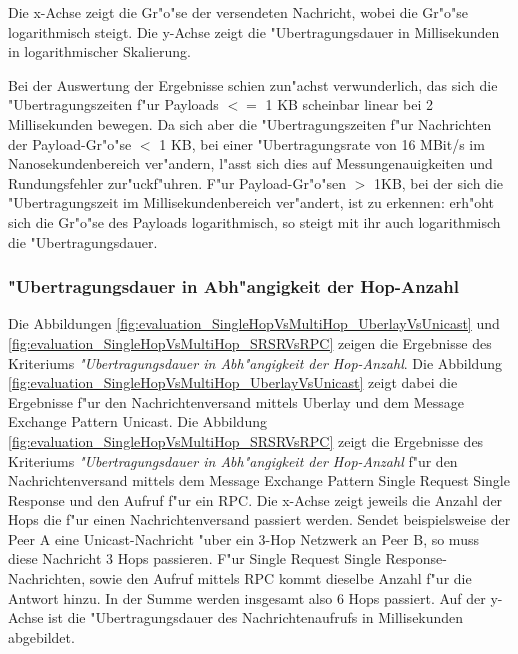 Die x-Achse zeigt die Gr"o"se der versendeten Nachricht, wobei die Gr"o"se logarithmisch steigt. Die y-Achse zeigt die "Ubertragungsdauer in Millisekunden in logarithmischer Skalierung.

Bei der Auswertung der Ergebnisse schien zun"achst verwunderlich, das sich die "Ubertragungszeiten f"ur Payloads $<=$ 1 KB scheinbar linear bei 2 Millisekunden bewegen. Da sich aber die "Ubertragungszeiten f"ur Nachrichten der Payload-Gr"o"se $<$ 1 KB, bei einer "Ubertragungsrate von 16 MBit/s im Nanosekundenbereich ver"andern, l"asst sich dies auf Messungenauigkeiten und Rundungsfehler zur"uckf"uhren. F"ur Payload-Gr"o"sen $>$ 1KB, bei der sich die "Ubertragungszeit  im Millisekundenbereich ver"andert, ist zu erkennen: erh"oht sich die Gr"o"se des Payloads logarithmisch, so steigt mit ihr auch logarithmisch die "Ubertragungsdauer.

\subsubsection{"Ubertragungsdauer in Abh"angigkeit der Hop-Anzahl}



Die Abbildungen \ref{fig:evaluation_SingleHopVsMultiHop_UberlayVsUnicast} und \ref{fig:evaluation_SingleHopVsMultiHop_SRSRVsRPC} zeigen die Ergebnisse des Kriteriums \emph{"Ubertragungsdauer in Abh"angigkeit der Hop-Anzahl}. Die Abbildung \ref{fig:evaluation_SingleHopVsMultiHop_UberlayVsUnicast} zeigt dabei die Ergebnisse f"ur den Nachrichtenversand mittels Uberlay und dem Message Exchange Pattern Unicast. Die Abbildung \ref{fig:evaluation_SingleHopVsMultiHop_SRSRVsRPC} zeigt die Ergebnisse des Kriteriums \emph{"Ubertragungsdauer in Abh"angigkeit der Hop-Anzahl} f"ur den Nachrichtenversand mittels dem Message Exchange Pattern Single Request Single Response und den Aufruf f"ur ein RPC. Die  x-Achse zeigt jeweils die Anzahl der Hops die f"ur einen Nachrichtenversand passiert werden. Sendet beispielsweise der Peer A eine Unicast-Nachricht "uber ein 3-Hop Netzwerk an Peer B, so muss diese Nachricht 3 Hops passieren. F"ur Single Request Single Response-Nachrichten, sowie den Aufruf mittels RPC kommt dieselbe Anzahl f"ur die Antwort hinzu. In der Summe werden insgesamt also 6 Hops passiert. Auf der y-Achse ist die "Ubertragungsdauer des Nachrichtenaufrufs in Millisekunden abgebildet.

